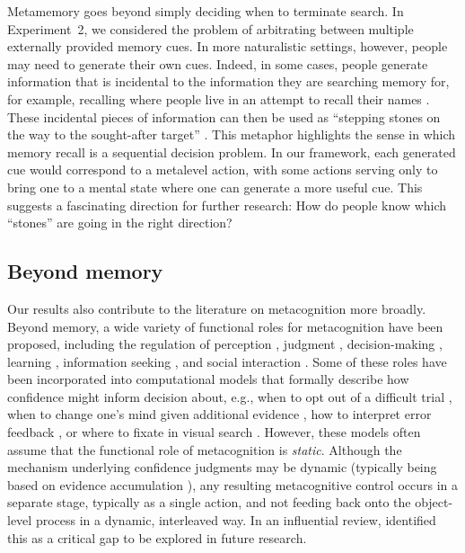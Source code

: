 Metamemory goes beyond simply deciding when to terminate search. In Experiment~2, we considered the problem of arbitrating between multiple externally provided memory cues. In more naturalistic settings, however, people may need to generate their own cues. Indeed, in some cases, people generate information that is incidental to the information they are searching memory for, for example, recalling where people live in an attempt to recall their names \citep{williams1981process}. These incidental pieces of information can then be used as ``stepping stones on the way to the sought-after target'' \citep[p. 334]{koriat2000control}. This metaphor highlights the sense in which memory recall is a sequential decision problem. In our framework, each generated cue would correspond to a metalevel action, with some actions serving only to bring one to a mental state where one can generate a more useful cue. This suggests a fascinating direction for further research: How do people know which ``stones'' are going in the right direction?

\subsection{Beyond memory}

Our results also contribute to the literature on metacognition more broadly. Beyond memory, a wide variety of functional roles for metacognition have been proposed, including the regulation of perception \citep{deroy2016metacognition}, judgment \citep{polania2019efficient,lebreton2015automatic}, decision-making \citep{yeung2012metacognition,demartino2013confidence}, learning \citep{fromer2021expectations,nassar2012rational}, information seeking \citep{boldt2019confidence,desender2018subjective}, and social interaction \citep{frith2012role}. Some of these roles have been incorporated into computational models that formally describe how confidence might inform decision about, e.g., when to opt out of a difficult trial \citep{kiani2009representation}, when to change one's mind given additional evidence \citep{folke2016explicit}, how to interpret error feedback \citep{fromer2021expectations}, or where to fixate in visual search \citep{stewart2022humans}. However, these models often assume that the functional role of metacognition is \emph{static}. Although the mechanism underlying confidence judgments may be dynamic (typically being based on evidence accumulation \citealp{vickers1970evidence,pleskac2010twostage,moreno-bote2010decision}), any resulting metacognitive control occurs in a separate stage, typically as a single action, and not feeding back onto the object-level process in a dynamic, interleaved way. In an influential review, \citet{yeung2012metacognition} identified this as a critical gap to be explored in future research.

